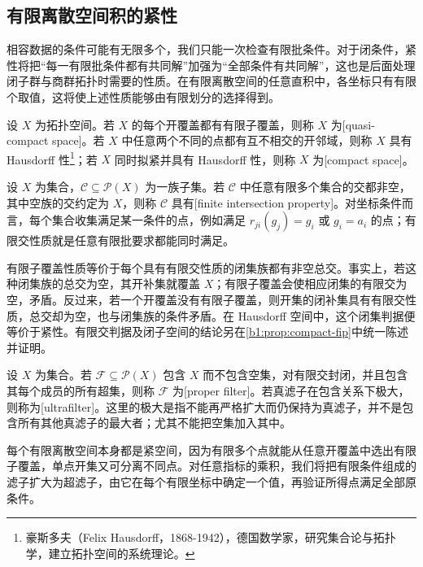 \subsection{有限离散空间积的紧性}
\label{b1:subsec:2202:04}
相容数据的条件可能有无限多个，我们只能一次检查有限批条件。对于闭条件，紧性将把“每一有限批条件都有共同解”加强为“全部条件有共同解”，这也是后面处理闭子群与商群拓扑时需要的性质。在有限离散空间的任意直积中，各坐标只有有限个取值，这将使上述性质能够由有限划分的选择得到。

\ProseParagraphBreak
设 \(X\) 为拓扑空间。若 \(X\) 的每个开覆盖都有有限子覆盖，则称 \(X\) 为[quasi-compact space]。若 \(X\) 中任意两个不同的点都有互不相交的开邻域，则称 \(X\) 具有 Hausdorff 性\footnote{豪斯多夫（Felix Hausdorff，1868-1942），德国数学家，研究集合论与拓扑学，建立拓扑空间的系统理论。}；若 \(X\) 同时拟紧并具有 Hausdorff 性，则称 \(X\) 为[compact space]。

\ProseParagraphBreak
设 \(X\) 为集合，\(\mathcal C\subseteq\mathcal P(X)\) 为一族子集。若 \(\mathcal C\) 中任意有限多个集合的交都非空，其中空族的交约定为 \(X\)，则称 \(\mathcal C\) 具有[finite intersection property]。对坐标条件而言，每个集合收集满足某一条件的点，例如满足 \(r_{ji}(g_j)=g_i\) 或 \(g_i=a_i\) 的点；有限交性质就是任意有限批要求都能同时满足。

\ProseParagraphBreak
有限子覆盖性质等价于每个具有有限交性质的闭集族都有非空总交。事实上，若这种闭集族的总交为空，其开补集就覆盖 \(X\)；有限子覆盖会使相应闭集的有限交为空，矛盾。反过来，若一个开覆盖没有有限子覆盖，则开集的闭补集具有有限交性质，总交却为空，也与闭集族的条件矛盾。在 Hausdorff 空间中，这个闭集判据便等价于紧性。有限交判据及闭子空间的结论另在\cref{b1:prop:compact-fip}中统一陈述并证明。

\ProseParagraphBreak
设 \(X\) 为集合。若 \(\mathcal F\subseteq\mathcal P(X)\) 包含 \(X\) 而不包含空集，对有限交封闭，并且包含其每个成员的所有超集，则称 \(\mathcal F\) 为[proper filter]。若真滤子在包含关系下极大，则称为[ultrafilter]。这里的极大是指不能再严格扩大而仍保持为真滤子，并不是包含所有其他真滤子的最大者；尤其不能把空集加入其中。

\ProseParagraphBreak
每个有限离散空间本身都是紧空间，因为有限多个点就能从任意开覆盖中选出有限子覆盖，单点开集又可分离不同点。对任意指标的乘积，我们将把有限条件组成的滤子扩大为超滤子，由它在每个有限坐标中确定一个值，再验证所得点满足全部原条件。

